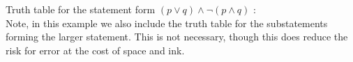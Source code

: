 \guard







\begin{exmp}
\label{exmp:notOrAndTruthTablesCombinations}
  Truth table for the statement form $(p\vee q ) \wedge \neg( p \wedge q )$ : \\
  Note, in this example we also include the truth table for the substatements forming the larger statement.
  This is not necessary, though this does reduce the risk for error at the cost of space and ink.
    \begin{center}
      
    \end{center}
\end{exmp}
